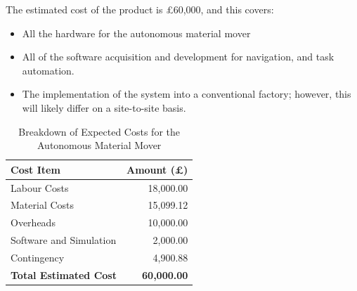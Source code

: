\documentclass[12pt]{article}
\begin{document}
\begin{table}[H]
    \centering
    \begin{minipage}[t]{0.5\textwidth}
        \setlength{\parskip}{0pt} %
        \vspace{-10pt}
        The estimated cost of the product \cite{P. Hinz} is £60,000, and this covers:
        \begin{itemize}
        \setlength{\itemsep}{1pt}
            \item All the hardware for the autonomous material mover
            \item All of the software acquisition and development for navigation, and task automation.
            \item The implementation of the system into a conventional factory; however, this will likely differ on a site-to-site basis.
        \end{itemize}
    \end{minipage}%
    \hfill
    \begin{minipage}[t]{0.45\textwidth}
        \centering
        \vspace{-10pt}
        \begin{tabular}{|l|r|}
            \hline
            \textbf{Cost Item}          & \textbf{Amount (£)} \\ \hline
            Labour Costs                 & 18,000.00           \\ \hline
            Material Costs              & 15,099.12           \\ \hline
            Overheads                   & 10,000.00           \\ \hline
            Software and Simulation     & 2,000.00            \\ \hline
            Contingency                 & 4,900.88            \\ \hline
            \textbf{Total Estimated Cost} & \textbf{60,000.00}  \\ \hline
        \end{tabular}
        \vspace{1pt} 
        \caption{Breakdown of Expected Costs for the Autonomous Material Mover}
        \label{tab:expected_costs}
    \end{minipage}
\end{table}
\end{document}
